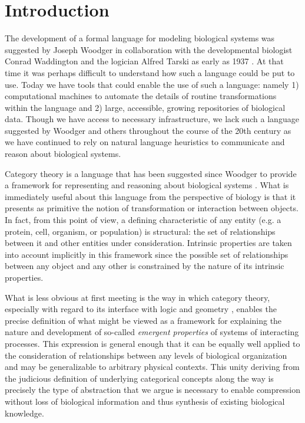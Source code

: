 \documentclass[aps,twocolumn]{revtex4-1}
\begin{document}
\section{Introduction}
The development of a formal language for modeling biological systems was suggested by Joseph Woodger in collaboration with the developmental biologist Conrad Waddington and the logician Alfred Tarski as early as 1937 \cite{Woodger1937,Woodger1951,Woodger1952,Woodger1952a}. At that time it was perhaps difficult to understand how such a language could be put to use. Today we have tools that could enable the use of such a language: namely 1) computational machines to automate the details of routine transformations within the language and 2) large, accessible, growing repositories of biological data. Though we have access to necessary infrastructure, we lack such a language suggested by Woodger and others throughout the course of the 20th century as we have continued to rely on natural language heuristics to communicate and reason about biological systems.

Category theory \cite{Lane1985,Lane1998,MacLane1992,Lawvere1997,Lawvere2003,Awodey2006} is a language that has been suggested since Woodger to provide a framework for representing and reasoning about biological systems \cite{GOGUEN1979,Ehresmann2007,Louie2009}. What is immediately useful about this language from the perspective of biology is that it presents as primitive the notion of transformation or interaction between objects. In fact, from this point of view, a defining characteristic of any entity (e.g. a protein, cell, organism, or population) is structural: the set of relationships between it and other entities under consideration. Intrinsic properties are taken into account implicitly in this framework since the possible set of relationships between any object and any other is constrained by the nature of its intrinsic properties. 

What is less obvious at first meeting is the way in which category theory, especially with regard to its interface with logic and geometry \cite{MacLane1992,Jacobs1998}, enables the precise definition of what might be viewed as a framework for explaining the nature and development of so-called \emph{emergent properties} of systems of interacting processes. This expression is general enough that it can be equally well applied to the consideration of relationships between any levels of biological organization and may be generalizable to arbitrary physical contexts. This unity deriving from the judicious definition of underlying categorical concepts along the way is precisely the type of abstraction that we argue is necessary to enable compression without loss of biological information and thus synthesis of existing biological knowledge.
\end{document}
